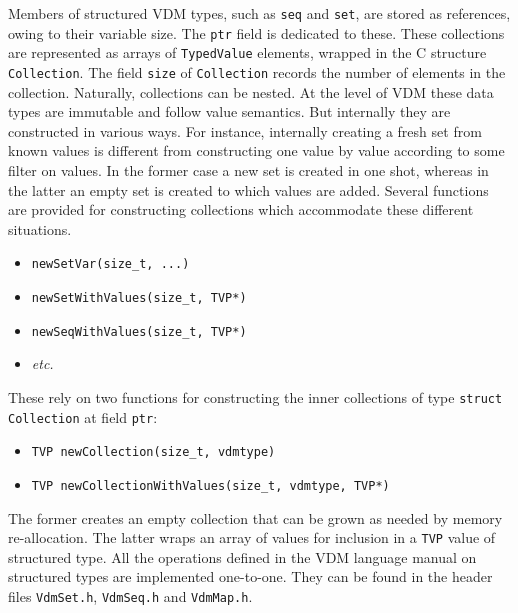 Members of structured VDM types, such as \texttt{seq} and \texttt{set}, are stored as references, owing to their variable size.
%
The \texttt{ptr} field is dedicated to these.
%
These collections are represented as arrays of \texttt{TypedValue} elements, wrapped in the C structure \texttt{Collection}.
%
The field \texttt{size} of \texttt{Collection} records the number of elements in the collection.
%
Naturally, collections can be nested.
%
At the level of VDM these data types are immutable and follow value semantics.
%
But internally they are constructed in various ways.
%
For instance, internally creating a fresh set from known values is different from constructing one value by value according to some filter on values.
%
In the former case a new set is created in one shot, whereas in the latter an empty set is created to which values are added.
%
Several functions are provided for constructing collections which accommodate these different situations.
%
%
%
\begin{itemize}
\item \texttt{newSetVar(size\_t, ...)}
\item \texttt{newSetWithValues(size\_t, TVP*)}
\item \texttt{newSeqWithValues(size\_t, TVP*)}
\item \emph{etc.\@}
\end{itemize}

These rely on two functions for constructing the inner collections of type \texttt{struct Collection} at field \texttt{ptr}:
%
%
%
\begin{itemize}
\item \texttt{TVP newCollection(size\_t, vdmtype)}
\item \texttt{TVP newCollectionWithValues(size\_t, vdmtype, TVP*)}
\end{itemize}
%
%
%
The former creates an empty collection that can be grown as needed by memory re-allocation.
%
The latter wraps an array of values for inclusion in a \texttt{TVP} value of structured type.
%
All the operations defined in the VDM language manual on structured types are implemented one-to-one.
%
They can be found in the header files \texttt{VdmSet.h}, \texttt{VdmSeq.h} and \texttt{VdmMap.h}.
%
%
%

